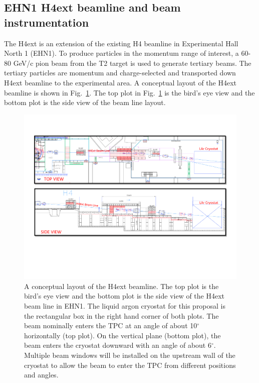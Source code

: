 \subsection{EHN1 H4ext beamline and beam instrumentation}
The H4ext is an extension of the existing H4 beamline in Experimental Hall North 1 (EHN1).  To produce particles in the momentum range of interest, a 60-80 GeV/c pion beam from the T2 target is used to generate tertiary beams. The tertiary particles are momentum and charge-selected and transported down H4ext beamline to the experimental area. A conceptual layout of the H4ext beamline is shown in Fig.~\ref{fig:H4extPrelim}.  The top plot in Fig.~\ref{fig:H4extPrelim} is the bird's eye view and the bottom plot is the side view of the beam line layout.

\begin{figure}[h]
  \centering
\includegraphics[scale=0.62]{figures/EHN1_H4ext.pdf}
  \caption{A conceptual layout of the H4ext beamline. The top plot is the bird's eye view and the bottom plot is the side view of the H4ext beam line in EHN1. The liquid argon cryostat for this proposal is the rectangular box in the right hand corner of both plots.  The beam nominally enters the TPC at an angle of about 10$^\circ$ horizontally (top plot). On the vertical plane (bottom plot), the beam enters the cryostat downward with an angle of about 6$^\circ$. Multiple beam windows will be installed on the upstream wall of the cryostat to allow the beam to enter the TPC from different positions and angles.}
  \label{fig:H4extPrelim}
\end{figure}

